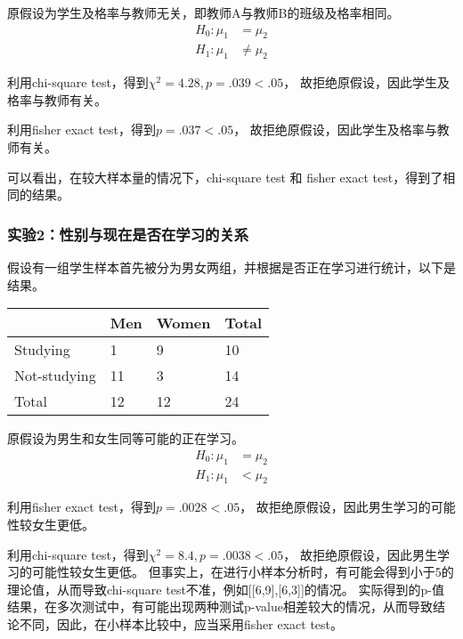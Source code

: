\documentclass[12pt]{article}
\numberwithin{figure}{section}
\begin{document}
原假设为学生及格率与教师无关，即教师A与教师B的班级及格率相同。
\begin{equation*}
    \begin{aligned}
        H_0:\mu_1&=\mu_2\\
        H_1:\mu_1&\neq\mu_2
    \end{aligned}
\end{equation*}

利用chi-square test，得到$\chi^{2}=4.28, p=.039<.05$， 故拒绝原假设，因此学生及格率与教师有关。

利用fisher exact test，得到$p=.037<.05$， 故拒绝原假设，因此学生及格率与教师有关。

可以看出，在较大样本量的情况下，chi-square test 和 fisher exact test，得到了相同的结果。


\subsubsection*{实验2：性别与现在是否在学习的关系}
假设有一组学生样本首先被分为男女两组，并根据是否正在学习进行统计，以下是结果。

\begin{table}[H]
    \centering
    \begin{tabular}{|l|l|l|l|}
    \hline
                 & Men & Women & Total \\ \hline
    Studying     & 1   & 9     & 10    \\ \hline
    Not-studying & 11  & 3     & 14    \\ \hline
    Total        & 12  & 12    & 24    \\ \hline
    \end{tabular}
\end{table}

原假设为男生和女生同等可能的正在学习。
\begin{equation*}
    \begin{aligned}
        H_0:\mu_1&=\mu_2\\
        H_1:\mu_1&<\mu_2
    \end{aligned}
\end{equation*}

利用fisher exact test，得到$p=.0028<.05$， 故拒绝原假设，因此男生学习的可能性较女生更低。

利用chi-square test，得到$\chi^{2}=8.4, p=.0038<.05$， 故拒绝原假设，因此男生学习的可能性较女生更低。
但事实上，在进行小样本分析时，有可能会得到小于5的理论值，从而导致chi-square test不准，例如[[6,9],[6,3]]的情况。
实际得到的p-值结果，在多次测试中，有可能出现两种测试p-value相差较大的情况，从而导致结论不同，因此，在小样本比较中，应当采用fisher exact test。
\end{document}
